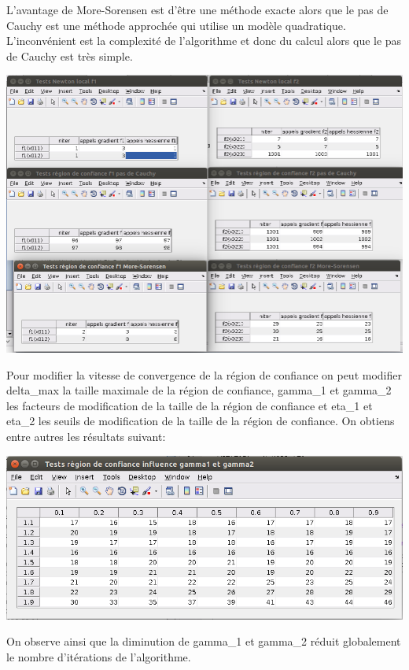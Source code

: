 \documentclass[a4paper,12pt]{article}
\begin{document}
L'avantage de More-Sorensen est d'être une méthode exacte alors que le pas de Cauchy est une méthode approchée qui utilise un modèle quadratique. L'inconvénient est la complexité de l'algorithme et donc du calcul alors que le pas de Cauchy est très simple.\\

\begin{center}
\includegraphics[width=14cm]{q3.png}
\end{center}

Pour modifier la vitesse de convergence de la région de confiance on peut modifier delta\_max la taille maximale de la région de confiance, gamma\_1 et gamma\_2 les facteurs de modification de la taille de la région de confiance et eta\_1 et eta\_2 les seuils de modification de la taille de la région de confiance. On obtiens entre autres les résultats suivant:\\

\begin{center}
\includegraphics[width=14cm]{q4.png}
\end{center}

On observe ainsi que la diminution de gamma\_1 et gamma\_2 réduit globalement le nombre d'itérations de l'algorithme.
\end{document}
